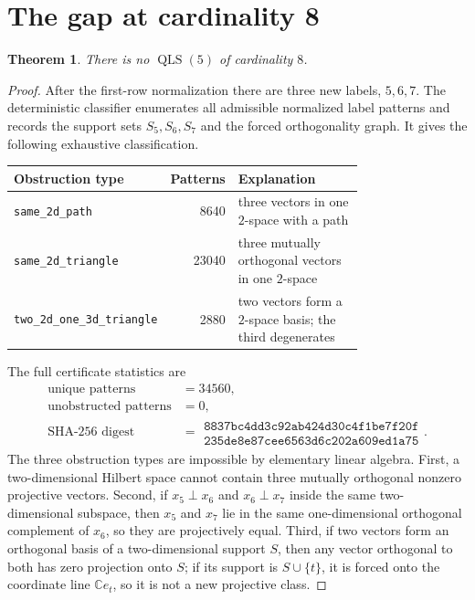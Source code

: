 \documentclass[11pt]{article}
\newtheorem{theorem}{Theorem}
\newcommand{\C}{\mathbb{C}}
\newcommand{\QLS}{\operatorname{QLS}}
\begin{document}
\section{The gap at cardinality 8}
\label{sec:c8}

\begin{theorem}
There is no \(\QLS(5)\) of cardinality \(8\).
\end{theorem}

\begin{proof}
After the first-row normalization there are three new labels, \(5,6,7\).
The deterministic classifier enumerates all admissible normalized label
patterns and records the support sets \(S_5,S_6,S_7\) and the forced
orthogonality graph.  It gives the following exhaustive classification.

\begin{center}
\begin{tabular}{@{}L{0.33\linewidth}rL{0.43\linewidth}@{}}
\toprule
Obstruction type & Patterns & Explanation \\
\midrule
\texttt{same\_2d\_path} & 8640 &
three vectors in one \(2\)-space with a path \\
\texttt{same\_2d\_triangle} & 23040 &
three mutually orthogonal vectors in one \(2\)-space \\
\texttt{two\_2d\_one\_3d\_triangle} & 2880 &
two vectors form a \(2\)-space basis; the third degenerates \\
\bottomrule
\end{tabular}
\end{center}

The full certificate statistics are
\[
\begin{array}{rl}
\text{unique patterns} &= 34560,\\
\text{unobstructed patterns} &= 0,\\
\text{SHA-256 digest} &=
\begin{gathered}
\texttt{8837bc4dd3c92ab424d30c4f1be7f20f}\\
\texttt{235de8e87cee6563d6c202a609ed1a75}
\end{gathered}.
\end{array}
\]
The three obstruction types are impossible by elementary linear algebra.
First, a two-dimensional Hilbert space cannot contain three mutually
orthogonal nonzero projective vectors.  Second, if \(x_5\perp x_6\) and
\(x_6\perp x_7\) inside the same two-dimensional subspace, then \(x_5\) and
\(x_7\) lie in the same one-dimensional orthogonal complement of \(x_6\), so
they are projectively equal.  Third, if two vectors form an orthogonal basis
of a two-dimensional support \(S\), then any vector orthogonal to both has
zero projection onto \(S\); if its support is \(S\cup\{t\}\), it is forced onto
the coordinate line \(\C e_t\), so it is not a new projective class.
\end{proof}
\end{document}
